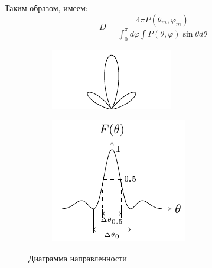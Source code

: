 Таким образом, имеем:
\begin{equation}
    D=\frac{4 \pi P\left(\theta_{m}, \varphi_{m}\right)}{\int_{0}^{\pi} d \varphi \int P(\theta, \varphi) \sin \theta d \theta}
    \label{eq:2}    
\end{equation}

\begin{center}
    \begin{figure}[h!]
        \begin{subfigure}[b]{.49\linewidth}
            \centering
            \includegraphics[width=\linewidth]{imgs/diag.pdf}
            \caption{}
            \label{fig:1:a}
        \end{subfigure}
        \begin{subfigure}[b]{.49\linewidth}
            \centering
            \includegraphics[width=\linewidth]{imgs/diag2.pdf}
            \caption{}
            \label{fig:1:b}
        \end{subfigure}
        \caption{Диаграмма направленности}
        \label{fig:1}
    \end{figure}
\end{center}

